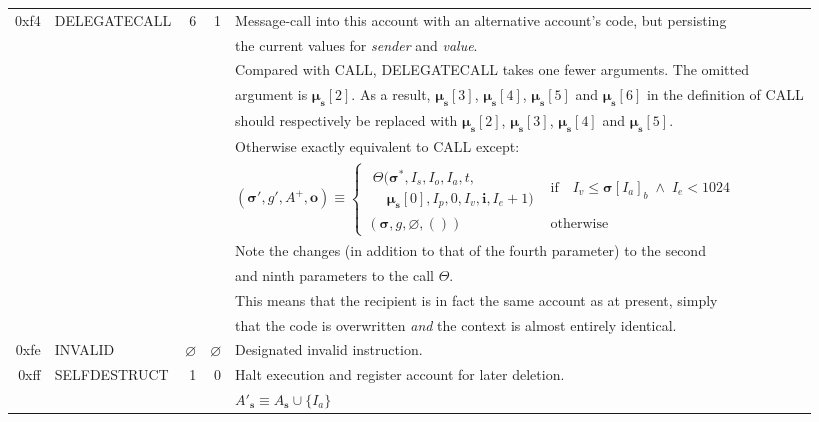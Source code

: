 \documentclass[9pt,oneside]{amsart}
\begin{document}
\begin{tabular*}{\columnwidth}[h]{rlrrl}
\midrule
0xf4 & {\small DELEGATECALL} & 6 & 1 & Message-call into this account with an alternative account's code, but persisting\\
&&&& the current values for {\it sender} and {\it value}. \\
&&&& Compared with {\small CALL}, {\small DELEGATECALL} takes one fewer arguments.  The omitted\\
&&&& argument is $\boldsymbol{\mu}_\mathbf{s}[2]$. As a result, $\boldsymbol{\mu}_\mathbf{s}[3]$, $\boldsymbol{\mu}_\mathbf{s}[4]$, $\boldsymbol{\mu}_\mathbf{s}[5]$ and $\boldsymbol{\mu}_\mathbf{s}[6]$ in the definition of {\small CALL} \\
&&&& should respectively be replaced with $\boldsymbol{\mu}_\mathbf{s}[2]$, $\boldsymbol{\mu}_\mathbf{s}[3]$, $\boldsymbol{\mu}_\mathbf{s}[4]$ and $\boldsymbol{\mu}_\mathbf{s}[5]$. \\
&&&& Otherwise exactly equivalent to {\small CALL} except: \\
&&&& $(\boldsymbol{\sigma}', g', A^+, \mathbf{o}) \equiv \begin{cases}\begin{array}{l}\Theta(\boldsymbol{\sigma}^*, I_s, I_o, I_a, t,\\\quad \boldsymbol{\mu}_\mathbf{s}[0], I_p, 0, I_v, \mathbf{i}, I_e + 1)\end{array} & \text{if} \quad I_v \leqslant \boldsymbol{\sigma}[I_a]_b \;\wedge\; I_e < 1024 \\ (\boldsymbol{\sigma}, g, \varnothing, ()) & \text{otherwise} \end{cases}$ \\
&&&& Note the changes (in addition to that of the fourth parameter) to the second \\
&&&& and ninth parameters to the call $\Theta$.\\
&&&& This means that the recipient is in fact the same account as at present, simply\\
&&&& that the code is overwritten {\it and} the context is almost entirely identical.\\
\midrule
0xfe & {\small INVALID} & $\varnothing$ & $\varnothing$ & Designated invalid instruction. \\
\midrule
0xff & {\small SELFDESTRUCT} & 1 & 0 & Halt execution and register account for later deletion. \\
&&&& $A'_\mathbf{s} \equiv A_\mathbf{s} \cup \{ I_a \}$ \\

\end{tabular*}
\end{document}
